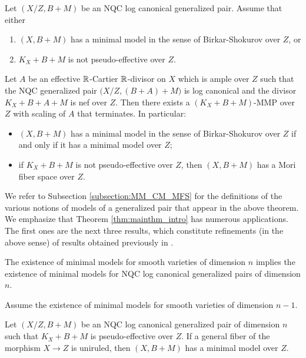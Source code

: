 	\begin{thmA}[= Theorem \ref{thm:mainthm}]
		\label{thm:mainthm_intro}
		Let $ (X/Z,B+M) $ be an NQC log canonical generalized pair. Assume that either
		\begin{enumerate}[\normalfont (a)]
			\item $ (X,B+M) $ has a minimal model in the sense of Birkar-Shokurov over $ Z $, or
			
			\item $ K_X+B+M $ is not pseudo-effective over $ Z $.
		\end{enumerate}
		Let $ A $ be an effective $ \mathbb{R} $-Cartier $ \mathbb{R} $-divisor on $ X $ which is ample over $ Z $ such that the NQC generalized pair $ \big( X/Z, (B+A)+M \big) $ is log canonical and the divisor $ K_X + B + A + M $ is nef over $Z$. Then there exists a $ (K_X + B + M) $-MMP over $Z$ with scaling of $A$ that terminates.
		In particular:
		\begin{itemize}
			\item $ (X,B+M) $ has a minimal model in the sense of Birkar-Shokurov over $ Z $ if and only if it has a minimal model over $Z$; 
			
			\item if $ K_X+B+M $ is not pseudo-effective over $ Z $, then $ (X,B+M) $ has a Mori fiber space over $ Z $.
		\end{itemize}
	\end{thmA}
	
	We refer to Subsection \ref{subsection:MM_CM_MFS} for the definitions of the various notions of models of a generalized pair that appear in the above theorem. We emphasize that Theorem \ref{thm:mainthm_intro} has numerous applications. The first ones are the next three results, which constitute refinements (in the above sense) of results obtained previously in \cite{LT22a,LT22b}.
	
	\begin{thmA}[= Theorem \ref{thm:EMM_implication}]
		\label{thm:EMM_implication_intro}
		The existence of minimal models for smooth varieties of dimension $n$ implies the existence of minimal models for NQC log canonical generalized pairs of dimension $n$.
	\end{thmA}
	
	\begin{thmA}[= Theorem \ref{thm:MM_uniruled}]
		\label{thm:MM_uniruled_intro}
		Assume the existence of minimal models for smooth varieties of dimension $n-1$.
		
		Let $ (X/Z,B+M) $ be an NQC log canonical generalized pair of dimension $ n $ such that $ K_X+B+M $ is pseudo-effective over $ Z $. If a general fiber of the morphism $ X \to Z $ is uniruled, then $(X,B+M)$ has a minimal model over $Z$.
	\end{thmA}
	
